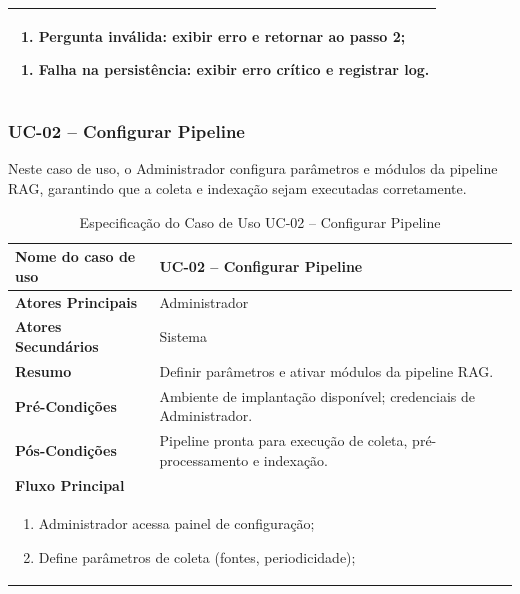 \begin{description}
\begin{table}[H]
\begin{tabular}{|p{4cm}|p{11cm}|}
    \multicolumn{2}{|p{15cm}|}{%
      \begin{enumerate}[label=\arabic* a\,.]
        \item Pergunta inválida: exibir erro e retornar ao passo 2;
      \end{enumerate}
      \begin{enumerate}[start=2, label=\arabic* a\,.]
        \item Falha na persistência: exibir erro crítico e registrar log.
      \end{enumerate}
    } \\ \hline
  \end{tabular}
\end{table}


\subsubsection{UC-02 – Configurar Pipeline}
\noindent Neste caso de uso, o Administrador configura parâmetros e módulos da pipeline RAG, garantindo que a coleta e indexação sejam executadas corretamente.
\begin{table}[H]
  \centering
  \caption{Especificação do Caso de Uso UC-02 – Configurar Pipeline}
  \label{tab:uc02}
  \begin{tabular}{|p{4cm}|p{11cm}|}
    \hline
    \textbf{Nome do caso de uso}    & UC-02 – Configurar Pipeline \\ \hline
    \textbf{Atores Principais}      & Administrador               \\ \hline
    \textbf{Atores Secundários}     & Sistema                     \\ \hline
    \textbf{Resumo}                 & Definir parâmetros e ativar módulos da pipeline RAG. \\ \hline
    \textbf{Pré-Condições}          & Ambiente de implantação disponível; credenciais de Administrador. \\ \hline
    \textbf{Pós-Condições}          & Pipeline pronta para execução de coleta, pré-processamento e indexação. \\ \hline
    \multicolumn{2}{|l|}{\textbf{Fluxo Principal}} \\ \hline
    \multicolumn{2}{|p{15cm}|}{%
      \begin{enumerate}[leftmargin=*]
        \item Administrador acessa painel de configuração;
        \item Define parâmetros de coleta (fontes, periodicidade);

\end{enumerate}}
\end{tabular}
\end{table}
\end{description}
